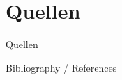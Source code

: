 %
%
%
%

\section{Quellen}


\begin{frame}[allowframebreaks]{Quellen}
 

  Bibliography / References

  \nocite{*}

  {\tiny 
%  
    \printbibliography %
  }

\end{frame}